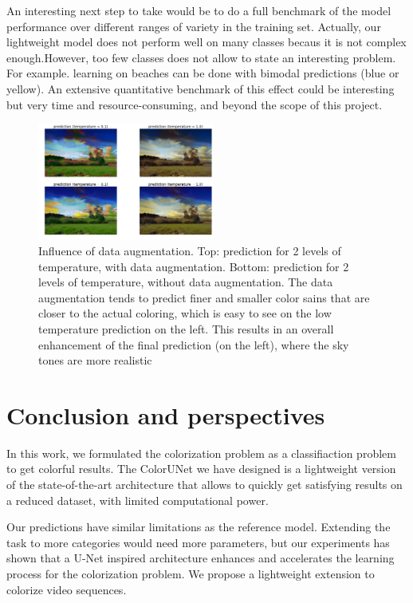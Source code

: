 \documentclass[10pt,twocolumn,letterpaper]{article}
\begin{document}
An interesting next step to take would be to do a full benchmark of the model performance over different ranges of variety in the training set. Actually, our lightweight model does not perform well on many classes becaus it is not complex enough.However, too few classes does not allow to state an interesting problem. For example. learning on beaches can be done with bimodal predictions (blue or yellow). An extensive quantitative benchmark of this effect could be interesting but very time and resource-consuming, and beyond the scope of this project.
\begin{figure}
\begin{center}
\includegraphics[width=220px]{da_comp}
\caption{Influence of data augmentation. Top: prediction for 2 levels of temperature, with data augmentation. Bottom:  prediction for 2 levels of temperature, without data augmentation. The data augmentation tends to predict finer and smaller color sains that are closer to the actual coloring, which is easy to see on the low temperature prediction on the left. This results in an overall enhancement of the final prediction (on the left), where the sky tones are more realistic  }
\label{dacomp}
\end{center}
\end{figure}
\section{Conclusion and perspectives}

In this work, we formulated the colorization problem as a classifiaction problem to get colorful results. The ColorUNet we have designed is a lightweight version of the state-of-the-art architecture that allows to quickly get satisfying results on a reduced dataset, with limited computational power.

Our predictions have similar limitations as the reference model. Extending the task to more categories would need more parameters, but our experiments has shown that a U-Net inspired architecture enhances and accelerates the learning process for the colorization problem. We propose a lightweight extension to colorize video sequences.
\end{document}
